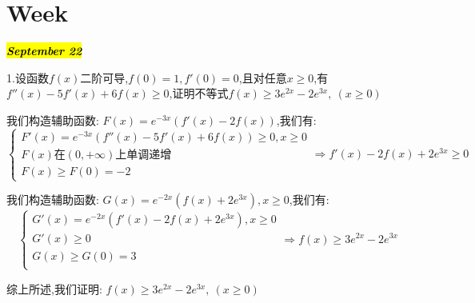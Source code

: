 \section{Week }
\hl{\textbf{\textit{September 22}}}

1.设函数$f(x)$二阶可导,$f(0)=1,f'(0)=0$,且对任意$x\geq 0$,有$f''(x)-5f'(x)+6f(x)\geq 0$,证明不等式$f(x)\geq 3e^{2x}-2e^{3x},\ (x\geq 0)$
\begin{solution}

	我们构造辅助函数:  $F(x)=e^{-3x}(f'(x)-2f(x))$,我们有:  
	$$\left\lbrace
	\begin{array}{l}
		F'(x)=e^{-3x}(f''(x)-5f'(x)+6f(x))\geq 0,x\geq 0\\
		F(x)\text{在}(0,+\infty)\text{上单调递增}\\
		F(x)\geq F(0)=-2
	\end{array}
	\right. \Rightarrow f'(x)-2f(x)+2e^{3x}\geq 0$$
	
	我们构造辅助函数:  $G(x)=e^{-2x}(f(x)+2e^{3x}),x\geq 0$,我们有:  
	$$\left\lbrace
	\begin{array}{l}
		G'(x)=e^{-2x}(f'(x)-2f(x)+2e^{3x}),x\geq 0\\
		G'(x)\geq 0\\
		G(x)\geq G(0)=3\\
	\end{array}
	\right. \Rightarrow f(x)\geq 3e^{2x}-2e^{3x}$$
	
	综上所述,我们证明:  $f(x)\geq 3e^{2x}-2e^{3x},\ (x\geq 0)$
\end{solution}


